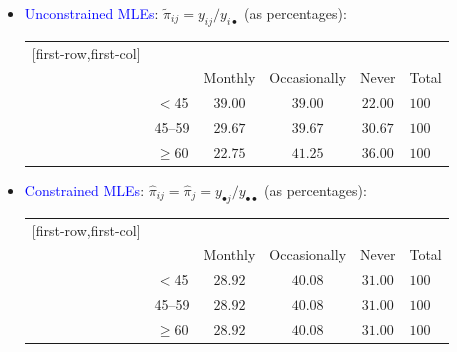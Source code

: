 \documentclass{article}\usepackage[]{graphicx}\usepackage[svgnames]{xcolor}
\begin{document}
\begin{itemize}
\begin{table}[H]
            \end{table}
      \item \textcolor{Blue}{Unconstrained MLEs}: $ \tilde{\pi}_{ij}=y_{ij}/y_{i\bullet} $ (as percentages):
            \begin{table}[H]
                  \centering
                  \begin{NiceTabular}{c|ccc|c}[first-row,first-col]
                        &&\\
                        && Monthly & Occasionally & Never & Total\\
                        \midrule
                         & $<$45 & $ 39.00 $ & $ 39.00 $ & $ 22.00 $ & $ 100 $\\
                        & 45--59 & $ 29.67 $ & $ 39.67 $ & $ 30.67 $ & $ 100 $\\
                        & $ \ge $60 & $ 22.75 $ & $ 41.25 $ & $ 36.00 $ & $ 100 $\\
                        \bottomrule
                  \end{NiceTabular}
            \end{table}
      \item \textcolor{Blue}{Constrained MLEs}: $ \hat{\pi}_{ij}=\hat{\pi}_j=y_{\bullet j}/y_{\bullet\bullet} $ (as percentages):
            \begin{table}[H]
                  \centering
                  \begin{NiceTabular}{c|ccc|c}[first-row,first-col]
                        &&\\
                        && Monthly & Occasionally & Never & Total\\
                        \midrule
                         & $<$45 & $ 28.92 $ & $ 40.08 $ & $ 31.00 $ & $ 100 $\\
                        & 45--59 & $ 28.92 $ & $ 40.08 $ & $ 31.00 $ & $ 100 $\\
                        & $ \ge $60 & $ 28.92 $ & $ 40.08 $ & $ 31.00 $ & $ 100 $\\
                        \bottomrule
                  \end{NiceTabular}
            \end{table}
\end{itemize}
\end{document}
